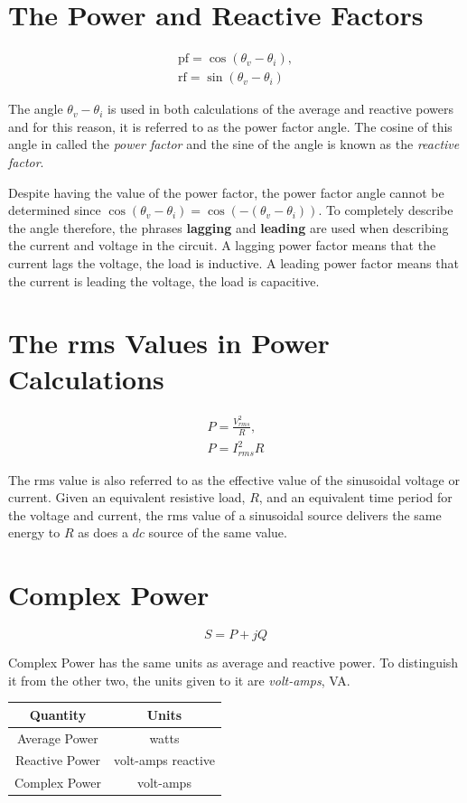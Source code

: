 \documentclass[12pt]{article}
\begin{document}
    \section*{The Power and Reactive Factors}
    \begin{gather*}
        \text{pf} = \cos (\theta_{v} - \theta_{i}), \\
        \text{rf} = \sin (\theta_{v} - \theta_{i})
    \end{gather*}
    \par The angle $\theta_{v} - \theta_{i}$ is used in both calculations of the
    average and reactive powers and for this reason, it is referred to as the
    power factor angle. The cosine of this angle in called the \textit{power
    factor} and the sine of the angle is known as the \textit{reactive factor}.
    \par Despite having the value of the power factor, the power factor angle
    cannot be determined since $\cos (\theta_{v} - \theta_{i}) = \cos (-
    (\theta_{v} - \theta_{i}))$. To completely describe the angle therefore, the
    phrases \textbf{lagging} and \textbf{leading} are used when describing the
    current and voltage in the circuit. A lagging power factor means that the
    current lags the voltage, the load is inductive. A leading power factor
    means that the current is leading the voltage, the load is capacitive.
    \section*{The rms Values in Power Calculations}
    \begin{gather*}
        P = \frac{V_{rms}^2}{R}, \\
        P = I_{rms}^2 R
    \end{gather*}
    \par The rms value is also referred to as the effective value of the
    sinusoidal voltage or current. Given an equivalent resistive load, $R$, and
    an equivalent time period for the voltage and current, the rms value of a
    sinusoidal source delivers the same energy to $R$ as does a $dc$ source of
    the same value.
    \section*{Complex Power}
    \[
        S = P + j Q
    \]
    \par Complex Power has the same units as average and reactive power. To
    distinguish it from the other two, the units given to it are
    \textit{volt-amps}, VA.
    \begin{table}[h]
        \centering
        \begin{tabular}{cc}
            \toprule
            Quantity & Units \\
            \midrule
            Average Power & watts \\
            Reactive Power & volt-amps reactive \\
            Complex Power & volt-amps \\
            \bottomrule
        \end{tabular}
    \end{table}
\end{document}
